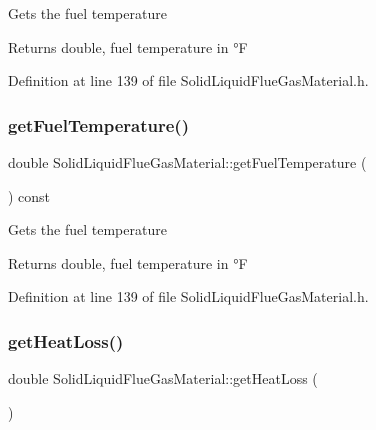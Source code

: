 Gets the fuel temperature \begin{DoxyReturn}{Returns}
double, fuel temperature in °F 
\end{DoxyReturn}


Definition at line 139 of file Solid\+Liquid\+Flue\+Gas\+Material.\+h.

\mbox{\label{class_solid_liquid_flue_gas_material_a629ecc7104b6bfbb696d9478c4b48e7a}} 
\subsubsection{\texorpdfstring{get\+Fuel\+Temperature()}{getFuelTemperature()}\hspace{0.1cm}{\footnotesize\ttfamily [3/3]}}
{\footnotesize\ttfamily double Solid\+Liquid\+Flue\+Gas\+Material\+::get\+Fuel\+Temperature (\begin{DoxyParamCaption}{ }\end{DoxyParamCaption}) const\hspace{0.3cm}{\ttfamily [inline]}}

Gets the fuel temperature \begin{DoxyReturn}{Returns}
double, fuel temperature in °F 
\end{DoxyReturn}


Definition at line 139 of file Solid\+Liquid\+Flue\+Gas\+Material.\+h.

\mbox{\label{class_solid_liquid_flue_gas_material_af7d36673e49f9b5eb631fc04227883d6}} 
\subsubsection{\texorpdfstring{get\+Heat\+Loss()}{getHeatLoss()}\hspace{0.1cm}{\footnotesize\ttfamily [1/3]}}
{\footnotesize\ttfamily double Solid\+Liquid\+Flue\+Gas\+Material\+::get\+Heat\+Loss (\begin{DoxyParamCaption}{ }\end{DoxyParamCaption})}

